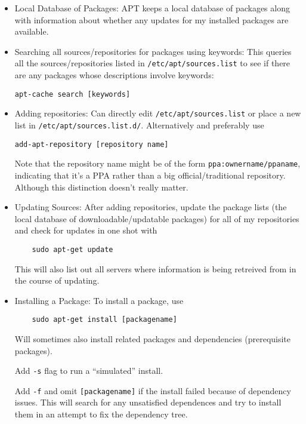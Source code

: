 \documentclass[12pt]{article}
\theoremstyle{plain}
\theoremstyle{definition}
\theoremstyle{remark}
\begin{document}
\begin{itemize}
  \item Local Database of Packages:
    APT keeps a local database of packages along with information about
    whether any updates for my installed packages are available.

  \item Searching all sources/repositories for packages using keywords:
    This queries all the sources/repositories listed in
    \texttt{/etc/apt/sources.list} to see if there are any packages
    whose descriptions involve keywords:
    \lstset{style=log}
    \begin{lstlisting}
apt-cache search [keywords]
    \end{lstlisting}

  \item Adding repositories:
    Can directly edit \texttt{/etc/apt/sources.list} or place a new
    list in \texttt{/etc/apt/sources.list.d/}.
    Alternatively and preferably use
    \begin{lstlisting}
add-apt-repository [repository name]
    \end{lstlisting}
    Note that the repository name might be of the form
    \texttt{ppa:ownername/ppaname}, indicating that it's a PPA rather
    than a big official/traditional repository. Although this
    distinction doesn't really matter.

  \item Updating Sources:
    After adding repositories, update the package lists (the local
    database of downloadable/updatable packages) for all of my
    repositories and check for updates in one shot with
    \begin{lstlisting}
    sudo apt-get update
    \end{lstlisting}
    This will also list out all servers where information is being
    retreived from in the course of updating.

  \item Installing a Package:
    To install a package, use
    \begin{lstlisting}
    sudo apt-get install [packagename]
    \end{lstlisting}
    Will sometimes also install related packages and dependencies
    (prerequisite packages).

    Add \texttt{-s} flag to run a ``simulated'' install.

    Add \texttt{-f} and omit \texttt{[packagename]} if the install
    failed because of dependency issues.
    This will search for any unsatisfied dependences and try to install
    them in an attempt to fix the dependency tree.


\end{itemize}
\end{document}
